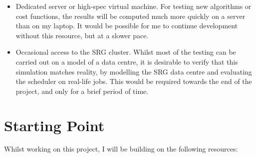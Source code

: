 \begin{itemize}
  \item Dedicated server or high-spec virtual machine. For testing new algorithms or cost functions, the results will be computed much more quickly on a server than on my laptop. It would be possible for me to continue development without this resource, but at a slower pace.
  \item Occasional access to the SRG cluster. Whilst most of the testing can be carried out on a model of a data centre, it is desirable to verify that this simulation matches reality, by modelling the SRG data centre and evaluating the scheduler on real-life jobs. This would be required towards the end of the project, and only for a brief period of time.
\end{itemize}

\section*{Starting Point}
Whilst working on this project, I will be building on the following resources:

